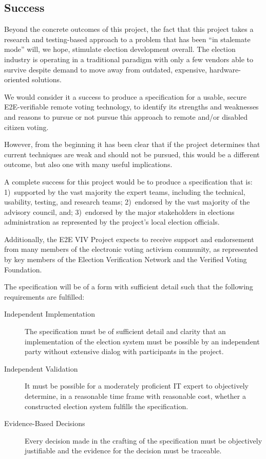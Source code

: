 \subsection{Success}
\label{sec:success}

Beyond the concrete outcomes of this project, the fact that this
project takes a research and testing-based approach to a problem that
has been “in stalemate mode” will, we hope, stimulate election
development overall. The election industry is operating in a
traditional paradigm with only a few vendors able to survive despite
demand to move away from outdated, expensive, hardware-oriented
solutions.

We would consider it a success to produce a specification for a
usable, secure E2E-verifiable remote voting technology, to identify
its strengths and weaknesses and reasons to pursue or not pursue this
approach to remote and/or disabled citizen voting.

However, from the beginning it has been clear that if the project
determines that current techniques are weak and should not be pursued,
this would be a different outcome, but also one with many useful
implications.

A complete success for this project would be to produce a
specification that is: 1)~supported by the vast majority the expert
teams, including the technical, usability, testing, and research
teams; 2)~endorsed by the vast majority of the advisory council, and;
3)~endorsed by the major stakeholders in elections administration as
represented by the project's local election officials.

Additionally, the E2E VIV Project expects to receive support and
endorsement from many members of the electronic voting activism
community, as represented by key members of the Election Verification
Network and the Verified Voting Foundation.

The specification will be of a form with sufficient detail such that
the following requirements are fulfilled:
\begin{description}
\item[Independent Implementation] The specification must be of
  sufficient detail and clarity that an implementation of the election
  system must be possible by an independent party without extensive
  dialog with participants in the project.
\item[Independent Validation] It must be possible for a moderately
  proficient IT expert to objectively determine, in a reasonable time
  frame with reasonable cost, whether a constructed election system fulfills the specification.
\item[Evidence-Based Decisions] Every decision made in the crafting of
  the specification must be objectively justifiable and the evidence
  for the decision must be traceable.
\end{description}

